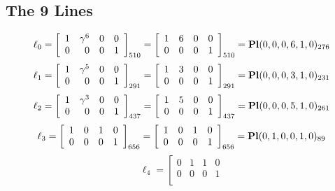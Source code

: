 \documentclass{article}
\begin{document}
{\subsection*{The 9 Lines}
$$
\ell_{0} = 
\left[
\begin{array}{*{4}{r}}
1 & \gamma^{6} & 0 & 0\\
0 & 0 & 0 & 1\\
\end{array}
\right]
_{510}
=
\left[
\begin{array}{*{4}c}
1  & 6  & 0  & 0\\
0  & 0  & 0  & 1\\
\end{array}
\right]_{510}
={\rm\bf Pl}(0,0,0,6,1,0 )_{276}$$
$$
\ell_{1} = 
\left[
\begin{array}{*{4}{r}}
1 & \gamma^{5} & 0 & 0\\
0 & 0 & 0 & 1\\
\end{array}
\right]
_{291}
=
\left[
\begin{array}{*{4}c}
1  & 3  & 0  & 0\\
0  & 0  & 0  & 1\\
\end{array}
\right]_{291}
={\rm\bf Pl}(0,0,0,3,1,0 )_{231}$$
$$
\ell_{2} = 
\left[
\begin{array}{*{4}{r}}
1 & \gamma^{3} & 0 & 0\\
0 & 0 & 0 & 1\\
\end{array}
\right]
_{437}
=
\left[
\begin{array}{*{4}c}
1  & 5  & 0  & 0\\
0  & 0  & 0  & 1\\
\end{array}
\right]_{437}
={\rm\bf Pl}(0,0,0,5,1,0 )_{261}$$
$$
\ell_{3} = 
\left[
\begin{array}{*{4}{r}}
1 & 0 & 1 & 0\\
0 & 0 & 0 & 1\\
\end{array}
\right]
_{656}
=
\left[
\begin{array}{*{4}c}
1  & 0  & 1  & 0\\
0  & 0  & 0  & 1\\
\end{array}
\right]_{656}
={\rm\bf Pl}(0,1,0,0,1,0 )_{89}$$
$$
\ell_{4} = 
\left[
\begin{array}{*{4}{r}}
0 & 1 & 1 & 0\\
0 & 0 & 0 & 1\\

\end{array}$$}
\end{document}
